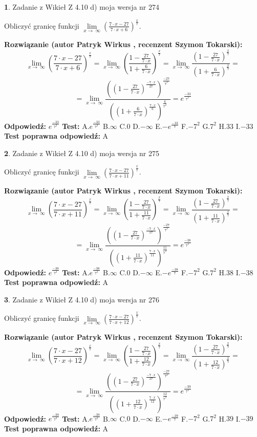 \documentclass[12pt, a4paper]{article}
\theoremstyle{definition} %
\newtheorem{zad}{}
\newcommand{\zadStart}[1]{\begin{zad}#1\newline}
\newcommand{\zadStop}{\end{zad}}
\newcommand{\rozwStart}[2]{\noindent \textbf{Rozwiązanie (autor #1 , recenzent #2): }\newline}
\newcommand{\rozwStop}{\newline}
\newcommand{\odpStart}{\noindent \textbf{Odpowiedź:}\newline}
\newcommand{\odpStop}{\newline}
\newcommand{\testStart}{\noindent \textbf{Test:}\newline}
\newcommand{\testStop}{\newline}
\newcommand{\kluczStart}{\noindent \textbf{Test poprawna odpowiedź:}\newline}
\newcommand{\kluczStop}{\newline}
\begin{document}
\zadStart{Zadanie z Wikieł Z 4.10 d) moja wersja nr 274}


Obliczyć granicę funkcji  $\lim\limits_{x\to\ \infty}(\frac{7\cdot x-27}{7\cdot x+6})^{\frac{x}{7}}$.
\zadStop
\rozwStart{Patryk Wirkus}{Szymon Tokarski}
$$\lim\limits_{x\to\ \infty}(\frac{7\cdot x-27}{7\cdot x+6})^{\frac{x}{7}} = \lim\limits_{x\to\ \infty}(\frac{1-\frac{27}{7\cdot x}}{1+\frac{6}{7\cdot x}})^{\frac{x}{7}}=\lim\limits_{x\to\ \infty}\frac{(1-\frac{27}{7\cdot x})^{\frac{x}{7}}}{(1+\frac{6}{7\cdot x})^{\frac{x}{7}}}=$$
$$=\lim\limits_{x\to\ \infty}\frac{((1-\frac{27}{7\cdot x})^{\frac{-7\cdot x}{27}})^{\frac{-27}{7^{2}}}}{((1+\frac{6}{7\cdot x})^{\frac{7\cdot x}{6}})^{\frac{6}{7^{2}}}}=e^{\frac{-33}{7^{2}}}$$
\rozwStop
\odpStart
$e^{\frac{-33}{7^{2}}}$
\odpStop
\testStart
A.$e^{\frac{-33}{7^{2}}}$ B.$\infty$ C.$0$ D.$-\infty$ E.$-e^{\frac{-33}{7}}$
F.$-7^{2}$ G.$7^{2}$
H.$33$
I.$-33$
\testStop
\kluczStart
A
\kluczStop



\zadStart{Zadanie z Wikieł Z 4.10 d) moja wersja nr 275}


Obliczyć granicę funkcji  $\lim\limits_{x\to\ \infty}(\frac{7\cdot x-27}{7\cdot x+11})^{\frac{x}{7}}$.
\zadStop
\rozwStart{Patryk Wirkus}{Szymon Tokarski}
$$\lim\limits_{x\to\ \infty}(\frac{7\cdot x-27}{7\cdot x+11})^{\frac{x}{7}} = \lim\limits_{x\to\ \infty}(\frac{1-\frac{27}{7\cdot x}}{1+\frac{11}{7\cdot x}})^{\frac{x}{7}}=\lim\limits_{x\to\ \infty}\frac{(1-\frac{27}{7\cdot x})^{\frac{x}{7}}}{(1+\frac{11}{7\cdot x})^{\frac{x}{7}}}=$$
$$=\lim\limits_{x\to\ \infty}\frac{((1-\frac{27}{7\cdot x})^{\frac{-7\cdot x}{27}})^{\frac{-27}{7^{2}}}}{((1+\frac{11}{7\cdot x})^{\frac{7\cdot x}{11}})^{\frac{11}{7^{2}}}}=e^{\frac{-38}{7^{2}}}$$
\rozwStop
\odpStart
$e^{\frac{-38}{7^{2}}}$
\odpStop
\testStart
A.$e^{\frac{-38}{7^{2}}}$ B.$\infty$ C.$0$ D.$-\infty$ E.$-e^{\frac{-38}{7}}$
F.$-7^{2}$ G.$7^{2}$
H.$38$
I.$-38$
\testStop
\kluczStart
A
\kluczStop



\zadStart{Zadanie z Wikieł Z 4.10 d) moja wersja nr 276}


Obliczyć granicę funkcji  $\lim\limits_{x\to\ \infty}(\frac{7\cdot x-27}{7\cdot x+12})^{\frac{x}{7}}$.
\zadStop
\rozwStart{Patryk Wirkus}{Szymon Tokarski}
$$\lim\limits_{x\to\ \infty}(\frac{7\cdot x-27}{7\cdot x+12})^{\frac{x}{7}} = \lim\limits_{x\to\ \infty}(\frac{1-\frac{27}{7\cdot x}}{1+\frac{12}{7\cdot x}})^{\frac{x}{7}}=\lim\limits_{x\to\ \infty}\frac{(1-\frac{27}{7\cdot x})^{\frac{x}{7}}}{(1+\frac{12}{7\cdot x})^{\frac{x}{7}}}=$$
$$=\lim\limits_{x\to\ \infty}\frac{((1-\frac{27}{7\cdot x})^{\frac{-7\cdot x}{27}})^{\frac{-27}{7^{2}}}}{((1+\frac{12}{7\cdot x})^{\frac{7\cdot x}{12}})^{\frac{12}{7^{2}}}}=e^{\frac{-39}{7^{2}}}$$
\rozwStop
\odpStart
$e^{\frac{-39}{7^{2}}}$
\odpStop
\testStart
A.$e^{\frac{-39}{7^{2}}}$ B.$\infty$ C.$0$ D.$-\infty$ E.$-e^{\frac{-39}{7}}$
F.$-7^{2}$ G.$7^{2}$
H.$39$
I.$-39$
\testStop
\kluczStart
A
\kluczStop
\end{document}
